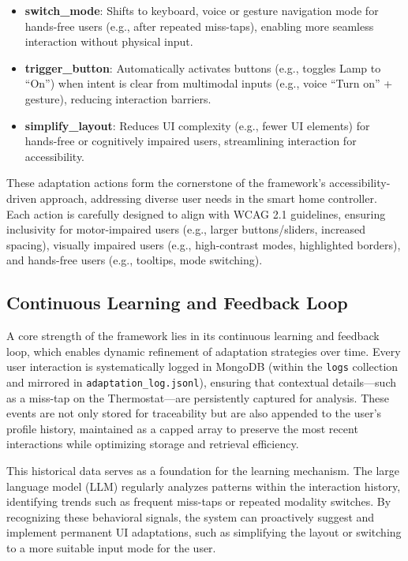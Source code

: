 \documentclass[openany]{book}
\begin{document}
\begin{itemize}
    \item \textbf{switch\_mode}: Shifts to keyboard, voice or gesture navigation mode for hands-free users (e.g., after repeated miss-taps), enabling more seamless interaction without physical input.
    \item \textbf{trigger\_button}: Automatically activates buttons (e.g., toggles Lamp to “On”) when intent is clear from multimodal inputs (e.g., voice “Turn on” + gesture), reducing interaction barriers.
    \item \textbf{simplify\_layout}: Reduces UI complexity (e.g., fewer UI elements) for hands-free or cognitively impaired users, streamlining interaction for accessibility.
\end{itemize}
These adaptation actions form the cornerstone of the framework’s accessibility-driven approach, addressing diverse user needs in the smart home controller. Each action is carefully designed to align with WCAG 2.1 guidelines, ensuring inclusivity for motor-impaired users (e.g., larger buttons/sliders, increased spacing), visually impaired users (e.g., high-contrast modes, highlighted borders), and hands-free users (e.g., tooltips, mode switching).

\subsection{Continuous Learning and Feedback Loop}
A core strength of the framework lies in its continuous learning and feedback loop, which enables dynamic refinement of adaptation strategies over time. Every user interaction is systematically logged in MongoDB (within the \texttt{logs} collection and mirrored in \texttt{adaptation\_log.jsonl}), ensuring that contextual details—such as a miss-tap on the Thermostat—are persistently captured for analysis. These events are not only stored for traceability but are also appended to the user’s profile history, maintained as a capped array to preserve the most recent interactions while optimizing storage and retrieval efficiency.

This historical data serves as a foundation for the learning mechanism. The large language model (LLM) regularly analyzes patterns within the interaction history, identifying trends such as frequent miss-taps or repeated modality switches. By recognizing these behavioral signals, the system can proactively suggest and implement permanent UI adaptations, such as simplifying the layout or switching to a more suitable input mode for the user.
\end{document}
